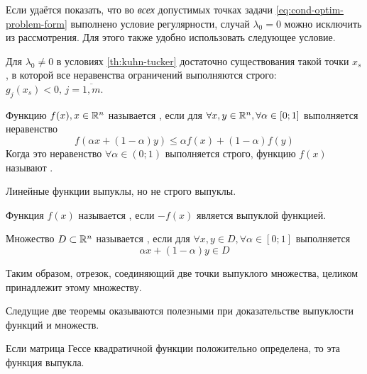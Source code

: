 Если удаётся показать, что во \emph{всех} допустимых точках задачи
\eqref{eq:cond-optim-problem-form} выполнено условие регулярности,
случай $\lambda_0=0$ можно исключить из рассмотрения. Для этого также
удобно использовать следующее условие.

\begin{thm}
  \label{th:slater}
  Для $\lambda_0 \neq 0$ в условиях \ref{th:kuhn-tucker} достаточно
  существования такой точки $x_s$, в которой все неравенства
  ограничений выполняются строго: $g_j(x_s)<0, \, j=\overline{1,m}$.
\end{thm}

\begin{dfn}
  \label{dfn:convex-f}
  Функцию $f(x), x \in \mathbb{R}^n$ называется , если
  для $\forall x, y \in \mathbb{R}^n, \forall \alpha \in [0;1]$
  выполняется неравенство
  \begin{equation*}
    f(\alpha x + (1-\alpha)y) \leq \alpha f(x) + (1-\alpha) f(y)
  \end{equation*}
  Когда это неравенство $\forall \alpha \in (0;1)$ выполняется строго,
  функцию $f(x)$ называют .
\end{dfn}
\begin{rem}
  \label{rem:lin-f-convex}
  Линейные функции выпуклы, но не строго выпуклы.
\end{rem}

\begin{dfn}
  Функция $f(x)$ называется , если $-f(x)$ является
  выпуклой функцией.
\end{dfn}

\begin{dfn}
  Множество $D \subset \mathbb{R}^n$ называется , если
  для $\forall x, y \in D, \forall \alpha \in [0;1]$ выполняется
  \begin{equation*}
    \alpha x + (1-\alpha) y \in D
  \end{equation*}
\end{dfn}
Таким образом, отрезок, соединяющий две точки выпуклого множества,
целиком принадлежит этому множеству.

Следущие две теоремы оказываются полезными при доказательстве
выпуклости функций и множеств.

\begin{thm}
  \label{th:convex-f}
  Если матрица Гессе квадратичной функции положительно определена, то
  эта функция выпукла.
\end{thm}

